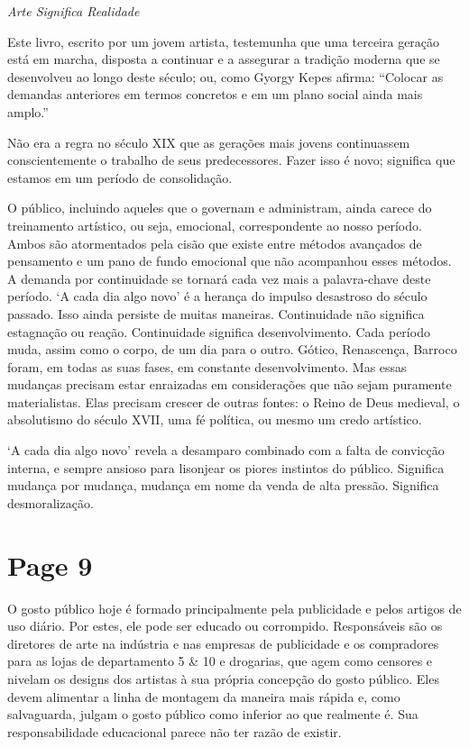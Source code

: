 \documentclass[a4paper]{article}
\begin{document}
\begin{center}
\textit{Arte Significa Realidade}
\end{center}

Este livro, escrito por um jovem artista, testemunha que uma terceira geração
está em marcha, disposta a continuar e a assegurar a tradição moderna
que se desenvolveu ao longo deste século; ou, como Gyorgy Kepes
afirma: ``Colocar as demandas anteriores em termos concretos e em um plano
social ainda mais amplo.''

Não era a regra no século XIX que as gerações mais jovens
continuassem conscientemente o trabalho de seus predecessores. Fazer isso é novo;
significa que estamos em um período de consolidação.

O público, incluindo aqueles que o governam e administram, ainda carece
do treinamento artístico, ou seja, emocional, correspondente ao nosso período. Ambos
são atormentados pela cisão que existe entre métodos avançados de pensamento
e um pano de fundo emocional que não acompanhou esses métodos.
A demanda por continuidade se tornará cada vez mais a palavra-chave deste
período. \lq A cada dia algo novo\rq{} é a herança do impulso
desastroso do século passado. Isso ainda persiste de muitas maneiras. Continuidade não significa
estagnação ou reação. Continuidade significa desenvolvimento. Cada período muda,
assim como o corpo, de um dia para o outro. Gótico, Renascença, Barroco foram, em
todas as suas fases, em constante desenvolvimento. Mas essas mudanças precisam estar enraizadas
em considerações que não sejam puramente materialistas. Elas precisam crescer de
outras fontes: o Reino de Deus medieval, o absolutismo do século XVII,
uma fé política, ou mesmo um credo artístico.

\lq A cada dia algo novo\rq{} revela a desamparo combinado com a falta de
convicção interna, e sempre ansioso para lisonjear os piores instintos do público.
Significa mudança por mudança, mudança em nome da venda de alta pressão.
Significa desmoralização.

\par
{}

\newpage
\section*{Page 9}

O gosto público hoje é formado principalmente pela publicidade e pelos artigos de uso diário. Por estes, ele pode ser educado ou corrompido. Responsáveis são os diretores de arte na indústria e nas empresas de publicidade e os compradores para as lojas de departamento 5 \& 10 e drogarias, que agem como censores e nivelam os designs dos artistas à sua própria concepção do gosto público. Eles devem alimentar a linha de montagem da maneira mais rápida e, como salvaguarda, julgam o gosto público como inferior ao que realmente é. Sua responsabilidade educacional parece não ter razão de existir.
\end{document}
